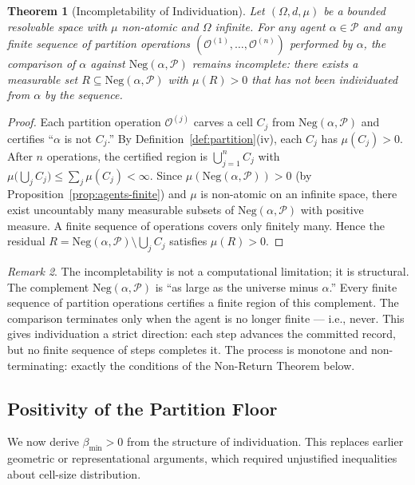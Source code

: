 \documentclass[12pt,a4paper,twocolumn]{article}
\theoremstyle{plain}
\newtheorem{theorem}{Theorem}[section]
\theoremstyle{definition}
\theoremstyle{remark}
\newtheorem{remark}[theorem]{Remark}
\newcommand{\Part}{\mathcal{P}}
\newcommand{\bmin}{\beta_{\min}}
\newcommand{\Neg}{\mathrm{Neg}}
\newcommand{\BRS}{(\Omega,d,\mu)}
\begin{document}
\begin{theorem}[Incompletability of Individuation]
\label{thm:incompletable}
Let $\BRS$ be a bounded resolvable space with $\mu$ non-atomic and
$\Omega$ infinite.  For any agent $\alpha \in \Part$ and any finite
sequence of partition operations $(\mathcal{O}^{(1)}, \ldots, \mathcal{O}^{(n)})$
performed by $\alpha$, the comparison of $\alpha$ against
$\Neg(\alpha, \Part)$ remains incomplete: there exists a measurable set
$R \subseteq \Neg(\alpha, \Part)$ with $\mu(R) > 0$ that has not been
individuated from $\alpha$ by the sequence.
\end{theorem}

\begin{proof}
Each partition operation $\mathcal{O}^{(j)}$ carves a cell $C_j$ from
$\Neg(\alpha, \Part)$ and certifies ``$\alpha$ is not $C_j$.''  By
Definition~\ref{def:partition}(iv), each $C_j$ has $\mu(C_j) > 0$.  After
$n$ operations, the certified region is $\bigcup_{j=1}^n C_j$ with
$\mu\!\bigl(\bigcup_j C_j\bigr) \leq \sum_j \mu(C_j) < \infty$.  Since
$\mu(\Neg(\alpha, \Part)) > 0$ (by Proposition~\ref{prop:agents-finite})
and $\mu$ is non-atomic on an infinite space, there exist uncountably many
measurable subsets of $\Neg(\alpha, \Part)$ with positive measure.  A
finite sequence of operations covers only finitely many.  Hence the
residual $R = \Neg(\alpha, \Part) \setminus \bigcup_j C_j$ satisfies
$\mu(R) > 0$.
\end{proof}

\begin{remark}
The incompletability is not a computational limitation; it is structural.
The complement $\Neg(\alpha, \Part)$ is ``as large as the universe minus
$\alpha$.''  Every finite sequence of partition operations certifies a
finite region of this complement.  The comparison terminates only when the
agent is no longer finite --- i.e., never.  This gives individuation a
strict direction: each step advances the committed record, but no finite
sequence of steps completes it.  The process is monotone and non-terminating:
exactly the conditions of the Non-Return Theorem below.
\end{remark}

\subsection{Positivity of the Partition Floor}

We now derive $\bmin > 0$ from the structure of individuation.  This
replaces earlier geometric or representational arguments, which required
unjustified inequalities about cell-size distribution.
\end{document}
